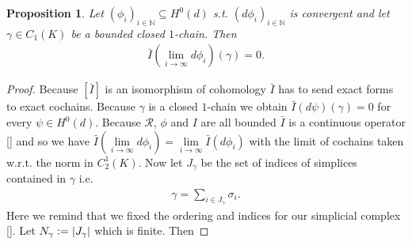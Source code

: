\documentclass[12pt,a4paper]{article}
\numberwithin{equation}{subsection}
\numberwithin{lemma}{subsection}
\newtheorem{proposition}[lemma]{Proposition}
\theoremstyle{definition}
\newcommand{\aop}{\mathscr{A}}
\newcommand{\rop}{\mathscr{R}} %
\begin{document}
\begin{proposition}\label{integral_exact_form_zero}
    Let $(\phi_i)_{i\in\mathbb{N}} \subseteq H^0(d)$ s.t. 
    $(d\phi_i)_{i\in\mathbb{N}}$ 
    is convergent and let $\gamma \in C_1(K)$ be a bounded closed $1$-chain.
    Then
    \begin{align*}
        \bar{I}(\lim\limits_{i \rightarrow \infty}d\phi_i)(\gamma) = 0.
    \end{align*}
\end{proposition}
\begin{proof}
    
    Because 
    $[\bar{I}]$ is an isomorphism of cohomology $\bar{I}$ has to send 
    exact forms to exact cochains. Because $\gamma$ is a closed $1$-chain 
    we obtain $\bar{I}(d\psi)(\gamma) = 0$ for every $\psi \in H^0(d)$. Because
    $\rop$, $\phi$ and $I$ are all bounded
    $\bar{I}$ is a continuous operator \ref{} and so we have 
    $\bar{I}(\lim\limits_{i \rightarrow \infty}d\phi_i) = 
    \lim\limits_{i \rightarrow \infty} \bar{I}(d\phi_i)$ with the limit of 
    cochains taken w.r.t. the norm 
    in $C^1_2(K)$. Now let $J_\gamma$ be the set of indices of simplices 
    contained in $\gamma$ i.e.
    \begin{align*}
        \gamma = \sum\limits_{i \in J_\gamma} \sigma_i.
    \end{align*}
    Here we remind that we fixed the ordering and indices for our simplicial 
    complex \ref{}. Let $N_\gamma \vcentcolon= |J_\gamma|$ which is finite. Then 


\end{proof}
\end{document}
